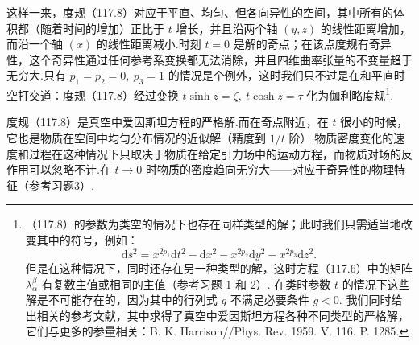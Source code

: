这样一来，度规（117.8）对应于平直、均匀、但各向异性的空间，其中所有的体积都（随着时间的增加）正比于 $t$ 增长，并且沿两个轴 $(y,z)$ 的线性距离增加，而沿一个轴 $(x)$ 的线性距离减小.时刻 $t=0$ 是解的奇点；在该点度规有奇异性，这个奇异性通过任何参考系变换都无法消除，并且四维曲率张量的不变量趋于无穷大.只有 $p_{1}=p_{2}=0,\ p_{3}=1$ 的情况是个例外，这时我们只不过是在和平直时空打交道：度规（117.8）经过变换 $t\sinh z=\zeta,\ t\cosh z=\tau$ 化为伽利略度规\footnote{（117.8）的参数为类空的情况下也存在同样类型的解；此时我们只需适当地改变其中的符号，例如：
\[
\mathrm{d}s^{2}=x^{2p_{1}}\mathrm{d}t^{2}-\mathrm{d}x^{2}-x^{2p_{2}}\mathrm{d}y^{2}-x^{2p_{3}}\mathrm{d}z^{2}.
\]
但是在这种情况下，同时还存在另一种类型的解，这时方程（117.6）中的矩阵 $\lambda_{\alpha}^{\beta}$ 有复数主值或相同的主值（参考习题 1 和 2）. 在类时参数 $t$ 的情况下这些解是不可能存在的，因为其中的行列式 $g$ 不满足必要条件 $g<0$.
我们同时给出相关的参考文献，其中求得了真空中爱因斯坦方程各种不同类型的严格解，它们与更多的参量相关：B. K. Harrison//Phys. Rev. 1959. V. 116. P. 1285.}.

度规（117.8）是真空中爱因斯坦方程的严格解.而在奇点附近，在 $t$ 很小的时候，它也是物质在空间中均匀分布情况的近似解（精度到 $1/t$ 阶）.物质密度变化的速度和过程在这种情况下只取决于物质在给定引力场中的运动方程，而物质对场的反作用可以忽略不计.在 $t\to0$ 时物质的密度趋向无穷大——对应于奇异性的物理特征（参考习题3）.

